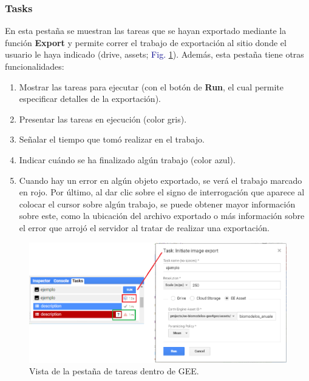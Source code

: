 \documentclass[
  12pt,
  letterpaper,
  twoside]{book}
\providecommand{\tightlist}{%
  \setlength{\itemsep}{0pt}\setlength{\parskip}{0pt}}
\newcommand\boldpurple[1]{\textcolor{darkpurple}{\textbf{#1}}}
\begin{document}
\hypertarget{tasks}{%
\subsubsection*{Tasks}\label{tasks}}

En esta pestaña se muestran las tareas que se hayan exportado mediante la función \boldpurple{Export} y permite correr el trabajo de exportación al sitio donde el usuario le haya indicado (drive, assets; \textcolor{darkblue}{Fig.} \ref{fig:f221}). Además, esta pestaña tiene otras funcionalidades:

\begin{enumerate}
\def\labelenumi{\arabic{enumi}.}
\tightlist
\item
  Mostrar las tareas para ejecutar (con el botón de \textbf{Run}, el cual permite especificar detalles de la exportación).
\item
  Presentar las tareas en ejecución (color gris).
\item
  Señalar el tiempo que tomó realizar en el trabajo.
\item
  Indicar cuándo se ha finalizado algún trabajo (color azul).
\item
  Cuando hay un error en algún objeto exportado, se verá el trabajo marcado en rojo. Por último, al dar clic sobre el signo de interrogación que aparece al colocar el cursor sobre algún trabajo, se puede obtener mayor información sobre este, como la ubicación del archivo exportado o más información sobre el error que arrojó el servidor al tratar de realizar una exportación.
\end{enumerate}

\begin{figure}[H]

{\centering \includegraphics[width=0.95\linewidth]{Img/task} 

}

\caption{Vista de la pestaña de tareas dentro de GEE.}\label{fig:f221}
\end{figure}
\end{document}
